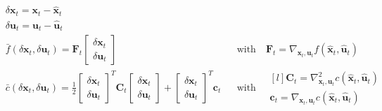 \begin{align}
	& \delta \textbf{x}_t = \textbf{x}_t - \widehat{\textbf{x}}_t\\
	& \delta \textbf{u}_t = \textbf{u}_t - \widehat{\textbf{u}}_t\\
	& \bar{f} (\delta\textbf{x}_t, \delta\textbf{u}_t) = \textbf{F}_t \begin{bmatrix}
		\delta\textbf{x}_t\\
		\delta\textbf{u}_t
	\end{bmatrix} &&\text{with}\quad \textbf{F}_t = \nabla_{\textbf{x}_t, \textbf{u}_t} f(\widehat{\textbf{x}}_t, \widehat{\textbf{u}}_t)\\
	& \bar{c} (\delta\textbf{x}_t, \delta\textbf{u}_t) = \frac{1}{2} \begin{bmatrix}
		\delta\textbf{x}_t\\
		\delta\textbf{u}_t
	\end{bmatrix}^T \textbf{C}_t \begin{bmatrix}
		\delta\textbf{x}_t\\
		\delta\textbf{u}_t
	\end{bmatrix} + \begin{bmatrix}
		\delta\textbf{x}_t\\
		\delta\textbf{u}_t
	\end{bmatrix}^T \textbf{c}_t && \text{with}\quad \begin{matrix*}[l]
		\textbf{C}_t = \nabla_{\textbf{x}_t, \textbf{u}_t}^2 c(\widehat{\textbf{x}}_t, \widehat{\textbf{u}}_t)\\
		\textbf{c}_t = \nabla_{\textbf{x}_t, \textbf{u}_t} c(\widehat{\textbf{x}}_t, \widehat{\textbf{u}}_t)
	\end{matrix*}
\end{align}

